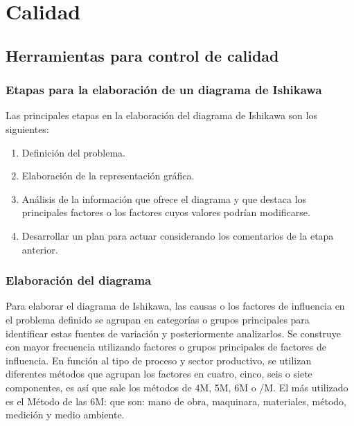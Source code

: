 \documentclass[../main]{subfiles}
\begin{document}
\chapter{Calidad}
\section{Herramientas para control de calidad}
\subsection{Etapas para la elaboración de un diagrama de Ishikawa}
Las principales etapas en la elaboración del diagrama de Ishikawa son
los siguientes:
\begin{enumerate}
  \item Definición del problema.
  \item Elaboración de la representación gráfica.
  \item Análisis de la información que ofrece el diagrama y que
    destaca los principales factores o los factores cuyos valores
    podrían modificarse.
  \item Desarrollar un plan para actuar considerando los comentarios
    de la etapa anterior.
\end{enumerate}
\subsection{Elaboración del diagrama}
Para elaborar el diagrama de Ishikawa, las causas o los factores de
influencia en el problema definido se agrupan en categorías o grupos
principales para identificar estas fuentes de variación y
posteriormente analizarlos. Se construye con mayor frecuencia
utilizando factores o grupos principales de factores de influencia.
En función al tipo de proceso y sector productivo, se utilizan
diferentes métodos que agrupan los factores en cuatro, cinco, seis o
siete componentes, es así que sale los métodos de 4M, 5M, 6M o /M.
El más utilizado es el Método de las 6M: que son: mano de obra,
maquinara, materiales, método, medición y medio ambiente.
\end{document}
